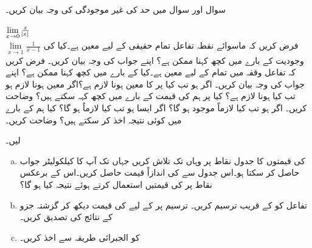 
سوال  اور سوال  میں حد کی غیر موجودگی کی وجہ بیان کریں۔

$\lim\limits_{x \to 0}\tfrac{x}{\abs{x}}$\\
$\lim\limits_{x \to 1}\tfrac{1}{x-1}$
فرض کریں کہ ماسوائے نقطہ  تفاعل  تمام حقیقی  کے لیے معین ہے۔کیا  کی وجودیت  کے بارے میں کچھ کہنا ممکن ہے؟ اپنے جواب کی وجہ بیان کریں۔ 
فرض کریں کہ  تفاعل  وقفہ  میں تمام   کے لیے معین ہے۔کیا  کے بارے میں کچھ کہنا ممکن ہے؟ اپنے جواب کی وجہ بیان کریں۔ 
اگر  ہو تب کیا  پر  کا معین ہونا لازم ہے؟اگر معین ہونا لازم ہو تب کیا  ہونا لازم ہے؟ کیا  پر ہم  کی قیمت کے بارے میں کچھ کہہ سکتے ہیں؟ وضاحت کریں۔
اگر  ہو تب کیا  لازماً موجود ہو گا؟ اگر ایسا ہو تب کیا  لازماً ہو گا؟ کیا ہم   کے بارے میں کوئی نتیجہ اخذ کر سکتے ہیں؟ وضاحت کریں۔


 لیں۔
\begin{enumerate}[a.]
\item
{} کی قیمتوں کا جدول نقاط  پر وہاں تک تلاش کریں جہاں تک آپ کا کیلکولیٹر جواب حاصل کر سکتا ہو۔اس جدول سے  کی اندازاً قیمت حاصل کریں۔اس کے برعکس نقاط  پر  کی قیمتیں استعمال کرتے ہوئے نتیجہ کیا ہو گا؟
\item
تفاعل کو  کے قریب ترسیم کریں۔ ترسیم پر  کے لیے  کی قیمت دیکھ کر  گزشتہ جزو کے نتائج کی تصدیق کریں۔ 
\item
{} کو الجبرائی طریقہ سے اخذ کریں۔
\end{enumerate}

